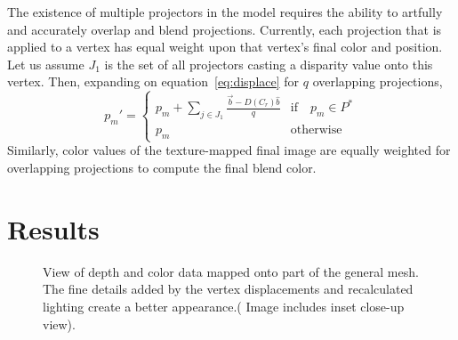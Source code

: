 \documentclass{llncs}
\begin{document}
The existence of multiple projectors in the model requires the ability to artfully and accurately overlap and blend projections. 
Currently, each projection that is applied to a vertex has equal weight upon that vertex's final color and position. Let us assume $J_1$ is the set of all projectors casting a disparity value onto this vertex. Then, expanding on equation~\ref{eq:displace} for $q$ overlapping projections,
\begin{equation}
p_{m}' = \left \{ 
\begin{array}{ll}
p_{m} + \sum\limits_{j \in J_1} \frac{\vec{b} - D(C_r)\hat{b}}{q} & \text{if} \quad p_{m} \in P^{*}\\
p_{m} & \text{otherwise}
\end{array}\right.
\label{eq:displaceBlend}
\end{equation}
Similarly, color values of the texture-mapped final image are equally weighted for overlapping projections to compute the final blend color.



\section{Results}
\label{sec:results}

\begin{figure*}[!ht]
   \vspace{-0.2cm}
   \caption{View of depth and color data mapped onto part of the general mesh. The fine details added by the vertex displacements and recalculated lighting create a better appearance.( Image includes inset close-up view).}
  \label{fig:resultFull}
\end{figure*}
\end{document}
